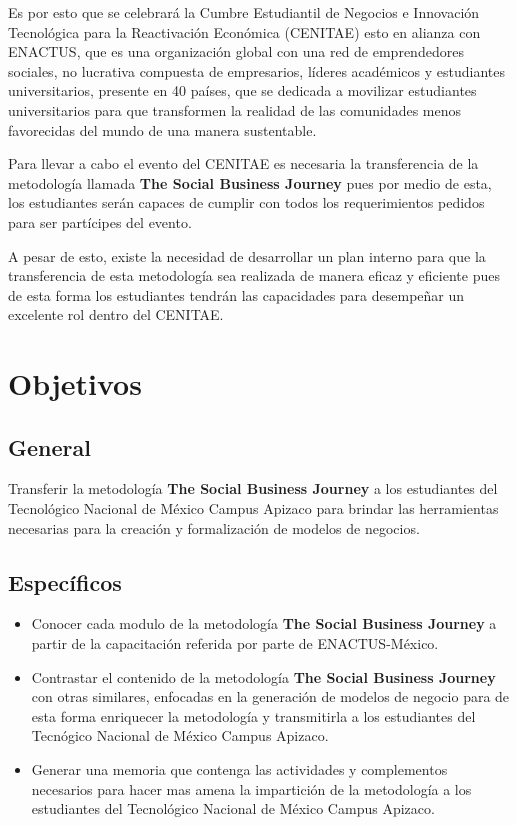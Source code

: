\documentclass{memoir}
\begin{document}
Es por esto que se celebrará la Cumbre Estudiantil de Negocios e Innovación Tecnológica para la Reactivación Económica (CENITAE) esto en alianza con ENACTUS, que es una organización global con una red de emprendedores sociales, no lucrativa compuesta de empresarios, líderes académicos y estudiantes universitarios, presente en 40 países, que se dedicada a movilizar estudiantes universitarios para que transformen la realidad de las comunidades menos favorecidas del mundo de una manera sustentable.

Para llevar a cabo el evento del CENITAE es necesaria la transferencia de la metodología llamada \textbf{The Social Business Journey} pues por medio de esta, los estudiantes serán capaces de cumplir con todos los requerimientos pedidos para ser partícipes del evento.

A pesar de esto, existe la necesidad de desarrollar un plan interno para que la transferencia de esta metodología sea realizada de manera eficaz y eficiente pues de esta forma los estudiantes tendrán las capacidades para desempeñar un excelente rol dentro del CENITAE.

\chapter{Objetivos}
\label{sec:org5a11dde}

\section{General}
\label{sec:orga80c7e0}

Transferir la metodología \textbf{The Social Business Journey} a los estudiantes del Tecnológico Nacional de México Campus Apizaco para brindar las herramientas necesarias para la creación y formalización de modelos de negocios.

\section{Específicos}
\label{sec:org07c3e5e}

\begin{itemize}
\item Conocer cada modulo de la metodología \textbf{The Social Business Journey} a partir de la capacitación referida por parte de ENACTUS-México.
\item Contrastar el contenido de la metodología \textbf{The Social Business Journey} con otras similares, enfocadas en la generación de modelos de negocio para de esta forma enriquecer la metodología y transmitirla a los estudiantes del Tecnógico Nacional de México Campus Apizaco.
\item Generar una memoria que contenga las actividades y complementos necesarios para hacer mas amena la impartición de la metodología a los estudiantes del Tecnológico Nacional de México Campus Apizaco.
\end{itemize}
\end{document}
